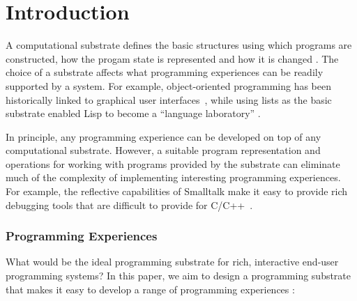 \documentclass[sigconf,anonymous,screen]{acmart}
\begin{document}

\section{Introduction}

A computational substrate defines the basic structures using which programs are constructed, how
the progam state is represented and how it is changed \cite{jakubovic-2022-ladder}. The choice of
a substrate affects what programming experiences can be readily supported by a system. For example,
object-oriented programming has been historically linked to graphical user
interfaces~\cite{kay-1993-smalltalk}, while using lists as the basic substrate enabled Lisp to become
a ``language laboratory'' \cite{steele-1993-lisp}.

In principle, any programming experience can be developed on top of any computational
substrate. However, a suitable program representation and operations for working with programs
provided by the substrate can eliminate much of the complexity of implementing interesting
programming experiences. For example, the reflective capabilities of Smalltalk make it easy
to provide rich debugging tools \cite{rauch-2019-babylonian} that are difficult to provide
for C/C++~\cite{kell-2018-unix,kell-2024-debugging}.

\subsubsection*{Programming Experiences}

What would be the ideal programming substrate for rich, interactive end-user programming systems?
In this paper, we aim to design a programming substrate that makes it easy to develop a range of
programming experiences \cite{myers-2006-eup}:
\end{document}
